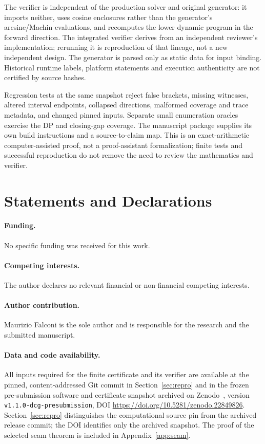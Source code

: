 \documentclass[11pt]{article}
\theoremstyle{definition}
\theoremstyle{remark}
\begin{document}
The verifier is independent of the production solver and original generator:
it imports neither, uses cosine enclosures rather than the generator's
arcsine/Machin evaluations, and recomputes the lower dynamic program in
the forward direction. The integrated verifier derives from an independent
reviewer's implementation; rerunning it is reproduction of that lineage,
not a new independent design. The generator is parsed only as static data
for input binding. Historical runtime labels, platform statements and
execution authenticity are not certified by source hashes.

Regression tests at the same snapshot reject false brackets, missing
witnesses, altered interval endpoints, collapsed directions, malformed
coverage and trace metadata, and changed pinned inputs. Separate small
enumeration oracles exercise the DP and closing-gap coverage. The manuscript
package supplies its own build instructions and a source-to-claim map.
This is an exact-arithmetic computer-assisted proof, not a proof-assistant
formalization; finite tests and successful reproduction do not remove the
need to review the mathematics and verifier.

\section*{Statements and Declarations}
\paragraph{Funding.} No specific funding was received for this work.
\paragraph{Competing interests.} The author declares no relevant financial
or non-financial competing interests.
\paragraph{Author contribution.} Maurizio Falconi is the sole author and is
responsible for the research and the submitted manuscript.
\paragraph{Data and code availability.} All inputs required for the finite
certificate and its verifier are available at the pinned, content-addressed
Git commit in Section~\ref{sec:repro} and in the frozen pre-submission
software and certificate snapshot archived on Zenodo~\cite{ringmin-archive},
version \texttt{v1.1.0-dcg-presubmission},
DOI \url{https://doi.org/10.5281/zenodo.22849826}.
Section~\ref{sec:repro} distinguishes the computational source pin from
the archived release commit; the DOI identifies only the archived snapshot.
The proof of the selected
seam theorem is included in Appendix~\ref{app:seam}.
\end{document}
